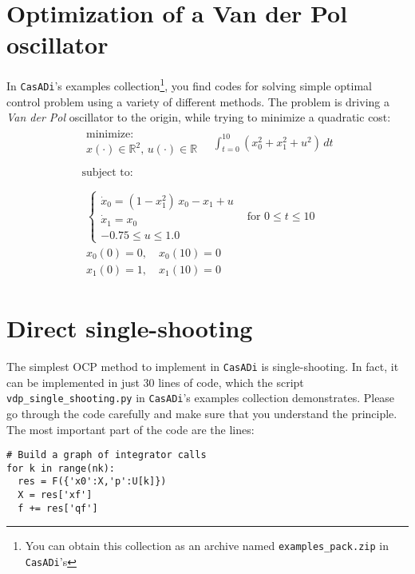 \documentclass[a4paper,12pt]{book}
\newcommand{\CasADi}{\texttt{CasADi}\xspace}
\begin{document}
\section{Optimization of a Van der Pol oscillator}
In \CasADi's examples collection\footnote{You can obtain this collection as an archive named \texttt{examples\_pack.zip} in \CasADi's }, you find codes for solving simple optimal control problem using a variety of different methods. The problem is driving a \emph{Van der Pol} oscillator to the origin, while trying to minimize a quadratic cost:
\begin{equation}
\begin{array}{lc}
\begin{array}{l}
\text{minimize:} \\
x(\cdot) \in \mathbb{R}^2, \, u(\cdot) \in \mathbb{R}
\end{array}
\quad \displaystyle \int_{t=0}^{10}{(x_0^2 + x_1^2 + u^2) \, dt}
\\
\\
\text{subject to:} \\
\\
\begin{array}{ll}
\left\{
\begin{array}{l}
\dot{x}_0 = (1-x_1^2) \, x_0 - x_1 + u \\
\dot{x}_1 = x_0 \\
-0.75 \le u \le 1.0
\end{array} \right. & \text{for $0 \le t \le 10$} \\
x_0(0)=0, \quad x_0(10)=0  \\
x_1(0)=1, \quad x_1(10)=0
\end{array}
\end{array}
\label{eq:vdp}
\end{equation}

\section{Direct single-shooting}
The simplest OCP method to implement in \CasADi is single-shooting. In fact, it can be implemented in just 30 lines of code, which the script {\texttt{vdp\_single\_shooting.py}} in \CasADi's examples collection demonstrates. Please go through the code carefully and make sure that you understand the principle. The most important part of the code are the lines:
\begin{verbatim}
# Build a graph of integrator calls
for k in range(nk):
  res = F({'x0':X,'p':U[k]})
  X = res['xf']
  f += res['qf']
\end{verbatim}
\end{document}
